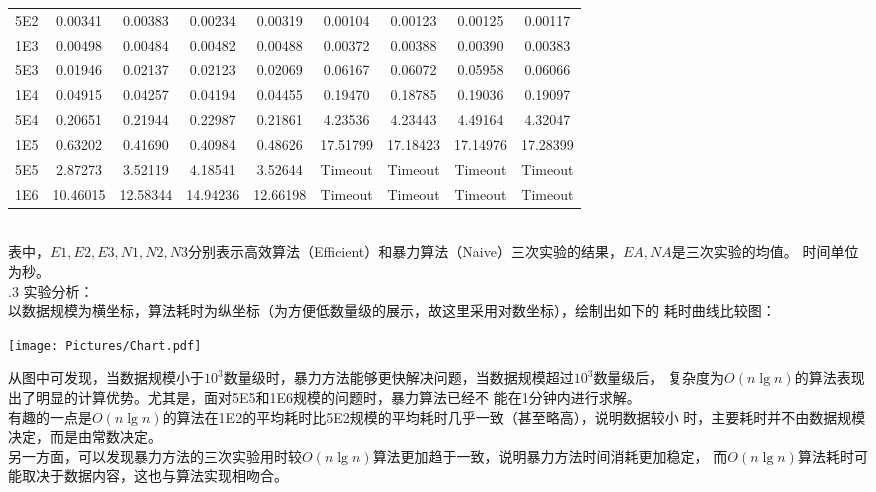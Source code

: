 \documentclass[a4paper]{article}
\begin{document}
\begin{enumerate}
{\begin{tabular}{c||ccc|c||ccc|c}
    5E2&0.00341 &0.00383 &0.00234 &0.00319 &0.00104 &0.00123 &0.00125 &0.00117\\
    1E3&0.00498 &0.00484 &0.00482 &0.00488 &0.00372 &0.00388 &0.00390 &0.00383\\
    5E3&0.01946 &0.02137 &0.02123 &0.02069 &0.06167 &0.06072 &0.05958 &0.06066\\
    1E4&0.04915 &0.04257 &0.04194 &0.04455 &0.19470 &0.18785 &0.19036 &0.19097\\
    5E4&0.20651 &0.21944 &0.22987 &0.21861 &4.23536 &4.23443 &4.49164 &4.32047\\
    1E5&0.63202 &0.41690 &0.40984 &0.48626 &17.51799 &17.18423 &17.14976 &17.28399 \\
    5E5&2.87273 &3.52119 &4.18541 &3.52644 &Timeout &Timeout &Timeout &Timeout\\
    1E6&10.46015 &12.58344 &14.94236 &12.66198  &Timeout &Timeout &Timeout &Timeout\\
    \hline\hline
  \end{tabular}
  }\\
  \medskip
  表中，$E1,E2,E3,N1,N2,N3$分别表示高效算法（Efficient）和暴力算法（Naive）三次实验的结果，$EA,NA$是三次实验的均值。
  时间单位为秒。\\
  .3 实验分析：\\
  以数据规模为横坐标，算法耗时为纵坐标（为方便低数量级的展示，故这里采用对数坐标），绘制出如下的
  耗时曲线比较图：
  \begin{center}
    \texttt{[image: Pictures/Chart.pdf]}
  \end{center}
  从图中可发现，当数据规模小于$10^3$数量级时，暴力方法能够更快解决问题，当数据规模超过$10^3$数量级后，
  复杂度为$O(n \lg n)$的算法表现出了明显的计算优势。尤其是，面对5E5和1E6规模的问题时，暴力算法已经不
  能在1分钟内进行求解。\\
  有趣的一点是$O(n \lg n)$的算法在1E2的平均耗时比5E2规模的平均耗时几乎一致（甚至略高），说明数据较小
  时，主要耗时并不由数据规模决定，而是由常数决定。\\
  另一方面，可以发现暴力方法的三次实验用时较$O(n \lg n)$算法更加趋于一致，说明暴力方法时间消耗更加稳定，
  而$O(n \lg n)$算法耗时可能取决于数据内容，这也与算法实现相吻合。
\end{enumerate}
\end{document}
